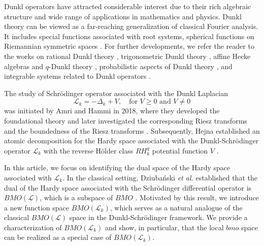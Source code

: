 \documentclass[11pt, reqno]{amsproc}
\theoremstyle{definition}
\theoremstyle{remark}
\numberwithin{equation}{section}
\begin{document}
Dunkl operators have attracted considerable interest due to their rich algebraic structure and wide range of applications in mathematics and physics. Dunkl theory can be viewed as a far-reaching generalization of classical Fourier analysis. It includes special functions associated with root systems, spherical functions on Riemannian symmetric spaces \cite{Heckman}. For further developments, we refer the reader to the works on rational Dunkl theory \cite{Dunkl-Xu, Rosler-03}, trigonometric Dunkl theory \cite{Opdam-2000}, affine Hecke algebras and $q$-Dunkl theory \cite{Cherednik, Macdonald}, probabilistic aspects of Dunkl theory \cite{Graczyk}, and integrable systems related to Dunkl operators \cite{Etingof}. 

\par The study of Schr\"odinger operator associated with the Dunkl Laplacian $$\mathcal{L}_k=-\Delta_k + V, \quad \text{for $V\geq 0$ and $V\neq 0$}$$  was initiated by Amri and Hammi in 2018, where they developed the foundational theory \cite{Amri-2018} and later investigated the corresponding Riesz transforms and the boundedness of the Riesz transforms \cite{Amri-2021}. Subsequently, Hejna established an atomic decomposition for the Hardy space associated with the Dunkl-Schr\"odinger operator $\mathcal{L}_k$ with the reverse H\"older class $RH_k^q$ potential function $V$ \cite{Hejna-2021}. 

 In this article, we focus on identifying the dual space of the Hardy space associated with $\mathcal{L}_k$. In the classical setting, Dziuba\'nski \textit{et al.} established that the dual of the Hardy space associated with the Schr\"odinger differential operator is $BMO(\mathcal{L})$, which is a subspace of $BMO$ \cite{Dziubanski-2005}. Motivated by this result, we introduce a new function space $BMO(\mathcal{L}_k)$, which serves as a natural analogue of the classical $BMO(\mathcal{L})$ space in the Dunkl-Schr\"odinger framework. We provide a characterization of $BMO(\mathcal{L}_k)$ and show, in particular, that the local $bmo$ space can be realized as a special case of $BMO(\mathcal{L}_k)$.
\end{document}
